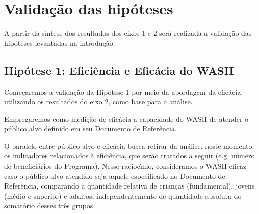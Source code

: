 \documentclass[
12pt,		%
openright,	%
twoside,  %
a4paper,			%
chapter=TITLE,		%
english,			%
french,				%
spanish,			%
brazil				%
]{USPSC-classe/USPSC}
\begin{document}
\section[Valida\c{c}\~ao das hip\'oteses]{Valida\c{c}\~ao das hip\'oteses}\label{Valida\c{c}\~ao das hip\'oteses}
A partir da s\'{\i}ntese dos resultados  dos eixos 1 e 2 ser\'a realizada  a valida\c{c}\~ao das hip\'oteses levantadas na introdu\c{c}\~ao.

















\subsection[Hip\'otese 1: Efici\^encia e Efic\'acia do WASH]{Hip\'otese 1: Efici\^encia e Efic\'acia do WASH}\label{Hip\'otese 1: Efici\^encia e Efic\'acia do WASH}
Come\c{c}aremos a valida\c{c}\~ao da Hip\'otese 1 por meio da abordagem da efic\'acia, utilizando os resultados do eixo 2, como base para a an\'alise.

















Empregaremos como medi\c{c}\~ao de efic\'acia a capacidade do WASH de atender o p\'ublico alvo definido em seu Documento de Refer\^encia.

















O paralelo entre \textquotedbl  p\'ublico alvo \textquotedbl  e efic\'acia busca retirar da an\'alise, neste momento, os indicadores relacionados \`a efici\^encia, que ser\~ao tratados a seguir (e.g. n\'umero de benefici\'arios do Programa). Nesse racioc\'{\i}nio, consideramos o WASH eficaz caso o p\'ublico alvo atendido seja aquele especificado no Documento de Refer\^encia, comparando a quantidade relativa de crian\c{c}as (fundamental), jovens (m\'edio e superior) e adultos, independentemente de quantidade absoluta do somat\'orio desses tr\^es grupos.
\end{document}
